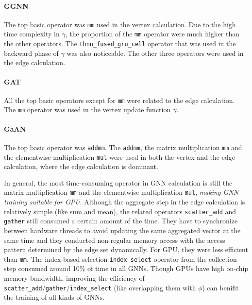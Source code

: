\paragraph{GGNN}
The top basic operator was \texttt{mm} used in the vertex calculation.
Due to the high time complexity in $\gamma$, the proportion of the \texttt{mm} operator were much higher than the other operators.
The \texttt{thnn\_fused\_gru\_cell} operator that was used in the backward phase of $\gamma$ was also noticeable.
The other three operators were used in the edge calculation.

\paragraph{GAT}
All the top basic operators except for \texttt{mm} were related to the edge calculation.
The \texttt{mm} operator was used in the vertex update function $\gamma$.

\paragraph{GaAN}
The top basic operator was \texttt{addmm}.
The \texttt{addmm}, the matrix multiplication \texttt{mm} and the elementwise multiplication \texttt{mul} were used in both the vertex and the edge calculation, where the edge calculation is dominant.

In general, the most time-consuming operator in GNN calculation is still the matrix multiplication \texttt{mm} and the elementwise multiplication \texttt{mul}, \emph{making GNN training suitable for GPU}.
Although the aggregate step in the edge calculation is relatively simple (like sum and mean), the related operators \texttt{scatter\_add} and \texttt{gather} still consumed a certain amount of the time.
They have to synchronize between hardware threads to avoid updating the same aggregated vector at the same time and they conducted non-regular memory access with the access pattern determined by the edge set dynamically.
For GPU, they were less efficient than \texttt{mm}.
The index-based selection \texttt{index\_select} operator from the collection step consumed around 10\% of time in all GNNs.
Though GPUs have high on-chip memory bandwidth, improving the efficiency of \texttt{scatter\_add}/\texttt{gather}/\texttt{index\_select} (like overlapping them with $\phi$) can benifit the training of all kinds of GNNs.

